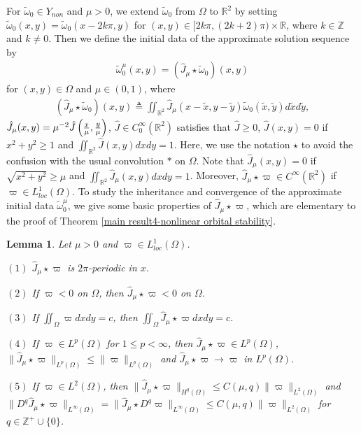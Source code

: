 \documentclass[1 [leqno, 11pt]{amsart}
\numberwithin{equation}{section}
\newtheorem{lemma}[Theorem]{Lemma}
\begin{document}
\begin{CJK*}{GBK}{song}
\begin{appendix}
For $\tilde\omega_0\in  Y_{non}$ and $\mu>0$,
we extend $\tilde\omega_0$ from $\Omega$ to $\mathbb{R}^2$ by setting $\tilde\omega_0(x,y)=\tilde \omega_0(x-2k\pi,y)$ for $(x,y)\in[2k\pi,(2k+2)\pi)\times \mathbb{R}$, where $k\in\mathbb{Z}$ and $k\neq0$.
Then we
 define the initial data of the approximate solution sequence by
\begin{align}\label{tilde-omega0-kappa-def}
\tilde\omega_{0}^{\mu}(x,y)=(\hat J_{\mu}\star\tilde\omega_{0})(x,y)
\end{align}
 for $(x,y)\in\Omega$ and $\mu\in(0,1)$,
 where
 \begin{align}\label{convolution-R2-def}
 (\hat J_{\mu}\star\tilde\omega_{0})(x,y)\triangleq\iint_{\mathbb{R}^2}\hat J_{\mu}(x-\tilde x,y-\tilde y)\tilde\omega_{0}(\tilde x,\tilde y)d\tilde x d\tilde y,
 \end{align}
  $\hat J_{\mu}(x,y)=\mu^{-2}\hat J\left({x\over \mu},{y\over \mu}\right)$, $\hat J\in C_0^\infty(\mathbb{R}^2)$ satisfies that $\hat J\geq0$, $\hat J(x,y)=0$ if $x^2+y^2\geq1$ and $\iint_{\mathbb{R}^2}\hat J(x,y) dxdy=1$.
 Here, we use the notation $\star$ to avoid the confusion with the usual convolution  $*$ on $\Omega$.
Note that $\hat J_{\mu}(x,y)=0$ if $\sqrt{x^2+y^2}\geq\mu$ and $\iint_{\mathbb{R}^2}\hat J_{\mu}(x,y)dxdy=1$. Moreover, $\hat J_{\mu}\star\varpi\in C^{\infty}(\mathbb{R}^2)$ if $\varpi\in L_{loc}^1(\Omega)$.
To study  the inheritance and convergence  of the  approximate  initial data $\tilde\omega_{0}^{\mu}$,
we give some basic properties of $\hat J_{\mu}\star\varpi$, which are elementary to the proof of  Theorem \ref{main result4-nonlinear orbital stability}.

\begin{lemma} \label{tilde-omega0-kappa-properties}
Let $\mu>0$ and $\varpi\in L_{loc}^1(\Omega)$.

$(1)$ $\hat J_{\mu}\star\varpi$ is $2\pi$-periodic in $x$.

$(2)$ If $\varpi<0$ on $\Omega$, then $\hat J_{\mu}\star\varpi<0$ on $\Omega$.

$(3)$ If $\iint_{\Omega}\varpi dxdy=c$, then $\iint_{\Omega}\hat J_{\mu}\star\varpi dxdy=c$.

$(4)$ If $\varpi\in L^p(\Omega)$ for $1\leq p<\infty$, then $\hat J_\mu\star\varpi\in L^p(\Omega)$, $\|\hat J_\mu\star\varpi\|_{L^p(\Omega)}\leq \|\varpi\|_{L^p(\Omega)}$ and $\hat J_\mu\star\varpi \to\varpi$ in ${L^p(\Omega)}$.


$(5)$ If $\varpi\in L^2(\Omega)$, then $\|\hat J_{\mu}\star\varpi\|_{H^q(\Omega)}\leq C(\mu,q)\|\varpi\|_{L^2(\Omega)}$ and $\|D^q\hat J_{\mu}\star\varpi\|_{L^\infty(\Omega)}=\|\hat J_{\mu}\star D^q\varpi\|_{L^\infty(\Omega)}\leq C(\mu,q)\|\varpi\|_{L^2(\Omega)}$ for $q\in\mathbb{Z}^+\cup\{0\}$.


\end{lemma}
\end{appendix}
\end{CJK*}
\end{document}

